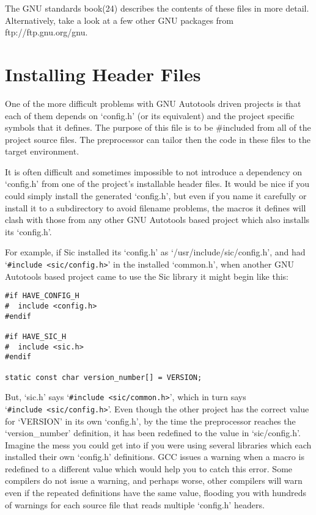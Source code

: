 The GNU standards book(24) describes the contents of these files in more detail.
Alternatively, take a look at a few other GNU packages from 
ftp://ftp.gnu.org/gnu. 

\section{Installing Header Files}


One of the more difficult problems with GNU Autotools driven projects is that 
each of them depends on `config.h' (or its equivalent) and the project 
specific symbols that it defines. The purpose of this file is to be \#included from all of the project source files. The preprocessor can tailor then the code in these files to the target environment. 

It is often difficult and sometimes impossible to not introduce a dependency on `config.h' from one of the project's installable header files. It would be nice if you could simply install the generated `config.h', but even if you name it carefully or install it to a subdirectory to avoid filename problems, the macros it defines will clash with those from any other GNU Autotools based project which also installs its `config.h'. 


For example, if Sic installed its `config.h' as `/usr/include/sic/config.h',
and had `\verb+#include <sic/config.h>+' in the installed `common.h', when 
another GNU Autotools based project came to use the Sic library it might begin 
like this: 

\begin{Verbatim}[frame=single]
#if HAVE_CONFIG_H
#  include <config.h>
#endif

#if HAVE_SIC_H
#  include <sic.h>
#endif

static const char version_number[] = VERSION;
\end{Verbatim}

But, `sic.h' says `\verb+#include <sic/common.h>+', which in turn says \\
`\verb+#include <sic/config.h>+'. Even though the other project has 
the correct
value for `VERSION' in its own `config.h', by the time the preprocessor
reaches the `version\_{}number' definition, it has been redefined to the 
value in `sic/config.h'. Imagine the mess you could get into if you were using 
several libraries which each installed their own `config.h' definitions. GCC issues a warning when a macro is redefined to a different value which would help you to catch this error. Some compilers do not issue a warning, and perhaps worse, other compilers will warn even if the repeated definitions have the same value, flooding you with hundreds of warnings for each source file that reads multiple `config.h' headers.

